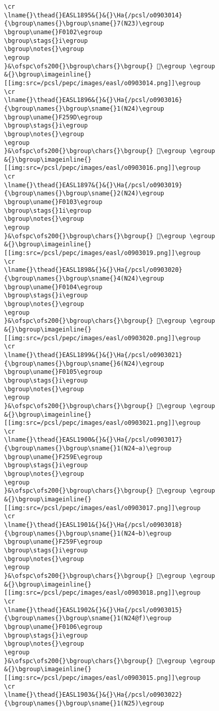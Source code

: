\begin{verbatim}
\cr
\lname{}\thead{}EASL1895&{}&{}\Ha{/pcsl/o0903014}{\bgroup\names{}\bgroup\sname{}7(N23)\egroup
\bgroup\uname{}F0102\egroup
\bgroup\stags{}i\egroup
\bgroup\notes{}\egroup
\egroup
}&\ofspc\ofs200{}\bgroup\chars{}\bgroup{} 󰄂\egroup \egroup
&{}\bgroup\imageinline{}[[img:src=/pcsl/pepc/images/easl/o0903014.png]]\egroup
\cr
\lname{}\thead{}EASL1896&{}&{}\Ha{/pcsl/o0903016}{\bgroup\names{}\bgroup\sname{}1(N24)\egroup
\bgroup\uname{}F259D\egroup
\bgroup\stags{}i\egroup
\bgroup\notes{}\egroup
\egroup
}&\ofspc\ofs200{}\bgroup\chars{}\bgroup{} 󲖝\egroup \egroup
&{}\bgroup\imageinline{}[[img:src=/pcsl/pepc/images/easl/o0903016.png]]\egroup
\cr
\lname{}\thead{}EASL1897&{}&{}\Ha{/pcsl/o0903019}{\bgroup\names{}\bgroup\sname{}2(N24)\egroup
\bgroup\uname{}F0103\egroup
\bgroup\stags{}1i\egroup
\bgroup\notes{}\egroup
\egroup
}&\ofspc\ofs200{}\bgroup\chars{}\bgroup{} 󰄃\egroup \egroup
&{}\bgroup\imageinline{}[[img:src=/pcsl/pepc/images/easl/o0903019.png]]\egroup
\cr
\lname{}\thead{}EASL1898&{}&{}\Ha{/pcsl/o0903020}{\bgroup\names{}\bgroup\sname{}4(N24)\egroup
\bgroup\uname{}F0104\egroup
\bgroup\stags{}i\egroup
\bgroup\notes{}\egroup
\egroup
}&\ofspc\ofs200{}\bgroup\chars{}\bgroup{} 󰄄\egroup \egroup
&{}\bgroup\imageinline{}[[img:src=/pcsl/pepc/images/easl/o0903020.png]]\egroup
\cr
\lname{}\thead{}EASL1899&{}&{}\Ha{/pcsl/o0903021}{\bgroup\names{}\bgroup\sname{}6(N24)\egroup
\bgroup\uname{}F0105\egroup
\bgroup\stags{}i\egroup
\bgroup\notes{}\egroup
\egroup
}&\ofspc\ofs200{}\bgroup\chars{}\bgroup{} 󰄅\egroup \egroup
&{}\bgroup\imageinline{}[[img:src=/pcsl/pepc/images/easl/o0903021.png]]\egroup
\cr
\lname{}\thead{}EASL1900&{}&{}\Ha{/pcsl/o0903017}{\bgroup\names{}\bgroup\sname{}1(N24∼a)\egroup
\bgroup\uname{}F259E\egroup
\bgroup\stags{}i\egroup
\bgroup\notes{}\egroup
\egroup
}&\ofspc\ofs200{}\bgroup\chars{}\bgroup{} 󲖞\egroup \egroup
&{}\bgroup\imageinline{}[[img:src=/pcsl/pepc/images/easl/o0903017.png]]\egroup
\cr
\lname{}\thead{}EASL1901&{}&{}\Ha{/pcsl/o0903018}{\bgroup\names{}\bgroup\sname{}1(N24∼b)\egroup
\bgroup\uname{}F259F\egroup
\bgroup\stags{}i\egroup
\bgroup\notes{}\egroup
\egroup
}&\ofspc\ofs200{}\bgroup\chars{}\bgroup{} 󲖟\egroup \egroup
&{}\bgroup\imageinline{}[[img:src=/pcsl/pepc/images/easl/o0903018.png]]\egroup
\cr
\lname{}\thead{}EASL1902&{}&{}\Ha{/pcsl/o0903015}{\bgroup\names{}\bgroup\sname{}1(N24@f)\egroup
\bgroup\uname{}F0106\egroup
\bgroup\stags{}i\egroup
\bgroup\notes{}\egroup
\egroup
}&\ofspc\ofs200{}\bgroup\chars{}\bgroup{} 󰄆\egroup \egroup
&{}\bgroup\imageinline{}[[img:src=/pcsl/pepc/images/easl/o0903015.png]]\egroup
\cr
\lname{}\thead{}EASL1903&{}&{}\Ha{/pcsl/o0903022}{\bgroup\names{}\bgroup\sname{}1(N25)\egroup

\end{verbatim}
